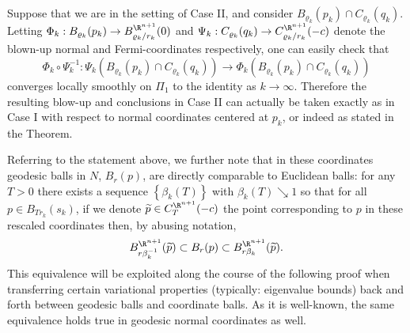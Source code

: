         	 	
        	 	\begin{rmk}\label{rmk:coord}
        	 		Suppose that we are in the setting of Case II, and consider $B_{\varrho_k}(p_k)\cap C_{\varrho_k}(q_k)$. Letting $\Phi_k : B_{\varrho_k}(p_k) \to B^{\R^{n+1}}_{\varrho_k/r_k}(0)$ and $\Psi_k : C_{\varrho_k}(q_k)\to C^{\R^{n+1}}_{\varrho_k/r_k}(-c)$ denote the blown-up normal and Fermi-coordinates respectively, one can easily check that 
        	 		$$\Phi_k\circ \Psi_k^{-1}:  \Psi_k(B_{\varrho_k}(p_k)\cap C_{\varrho_k}(q_k)) \longrightarrow \Phi_k(B_{\varrho_k}(p_k)\cap C_{\varrho_k}(q_k))$$
        	 		converges locally smoothly on $\Pi_1$ to the identity as $k\to \infty$. Therefore the resulting blow-up and conclusions in Case II can actually be taken exactly as in Case I with respect to normal coordinates centered at $p_k$, or indeed as stated in the Theorem. 
        	 	\end{rmk}
        	 	
        	 	\begin{rmk}\label{rmk:equivballs}
        	 			Referring to the statement above, we further note that in these coordinates geodesic balls in $N$, $B_r(p)$, are directly comparable to Euclidean balls: for any $T>0$ there exists a sequence $\left\{\beta_k(T)\right\}$ with $\beta_k(T) \searrow 1$ so that for all $p\in B_{Tr_k}(s_k)$, if we denote $\widetilde{p}\in C^{\R^{n+1}}_{T}(-c)$ the point corresponding to $p$ in these rescaled coordinates then, by abusing notation,  
        	 			$$B^{\R^{n+1}}_{r\beta_k^{-1}}(\widetilde{p}) \subset B_r(p)\subset B^{\R^{n+1}}_{r \beta_k}(\widetilde{p}).$$
        	 		 This equivalence will be exploited along the course of the following proof when transferring certain variational properties (typically: eigenvalue bounds) back and forth between geodesic balls and coordinate balls. As it is well-known, the same equivalence holds true in geodesic normal coordinates as well.
        	 	\end{rmk}	
        	 	
        
        	 	
        	 	
        	 	
        	 	
        	 	
        	 	
        	 	
        	 	
